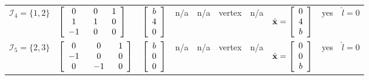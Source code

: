 \documentclass[9pt,twocolumn,twoside,lineno]{pnas-new-1}
\newcommand{\bfx}{{\bf x}}
\newcommand{\calI}{{\mathcal I}}
\theoremstyle{remark}
\begin{document}
\begin{landscape}
\begin{table}[htbp]
\begin{threeparttable}[htbp]
\begin{tabular}{l l l l l l l l l l}
$\calI_4=\{1,2\}$ & \hspace{-0.1cm}$\left[ \renewcommand{\arraystretch}{1} \begin{array}{ccc} 0 & ~~0~~ & 1 \\ 1 & ~~1~~ & 0 \\ -1 & ~~0~~ & 0 \end{array}\right]$ & \hspace{-0.3cm}$\left[ \renewcommand{\arraystretch}{1} \begin{array}{c} b\\ 4\\ 0\end{array}\right]$ & \hspace{-0.15cm}n/a & \hspace{-0.2cm}n/a & \hspace{-0.1cm}vertex & \hspace{-0.1cm}n/a & \hspace{-0.1cm}$\hat\bfx=\left[ \renewcommand{\arraystretch}{1} \begin{array}{c} 0\\ 4\\ b\end{array}\right]$ & \hspace{-0.1cm}yes & \hspace{-0.1cm}$\hat l=0$ \vspace{0.1cm} \vspace{0.1cm} \\
$\calI_5=\{2,3\}$ & \hspace{-0.1cm}$\left[ \renewcommand{\arraystretch}{1} \begin{array}{ccc} 0 & ~~0~~ & 1 \\ -1 & ~~0~~ & 0 \\ 0 & ~~{-1}~~ & 0 \end{array}\right]$ & \hspace{-0.3cm}$\left[ \renewcommand{\arraystretch}{1} \begin{array}{c} b\\ 0\\ 0\end{array}\right]$ & \hspace{-0.15cm}n/a & \hspace{-0.2cm}n/a & \hspace{-0.1cm}vertex & \hspace{-0.1cm}n/a & \hspace{-0.1cm}$\hat\bfx=\left[ \renewcommand{\arraystretch}{1} \begin{array}{c} 0\\ 0\\ b\end{array}\right]$ & \hspace{-0.1cm}yes & \hspace{-0.1cm}$\hat l=0$ \vspace{0.1cm} \vspace{0.1cm} \\

\end{tabular}
\end{threeparttable}
\end{table}
\end{landscape}
\end{document}
